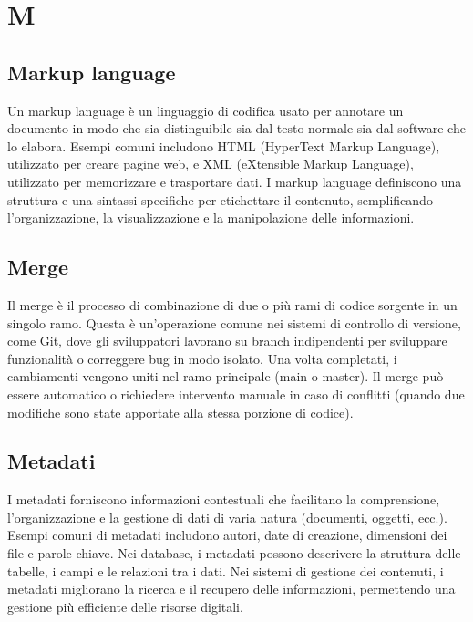 \section{M}
\vspace{2em}
\subsection*{Markup language}
\par Un markup language è un linguaggio di codifica usato per annotare un documento in modo che sia distinguibile sia dal testo normale sia dal software che lo elabora. Esempi comuni includono HTML (HyperText Markup Language), utilizzato per creare pagine web, e XML (eXtensible Markup Language), utilizzato per memorizzare e trasportare dati. I markup language definiscono una struttura e una sintassi specifiche per etichettare il contenuto, semplificando l'organizzazione, la visualizzazione e la manipolazione delle informazioni.

\vspace{2em}
\subsection*{Merge}
\par Il merge è il processo di combinazione di due o più rami di codice sorgente in un singolo ramo. Questa è un'operazione comune nei sistemi di controllo di versione, come Git, dove gli sviluppatori lavorano su branch indipendenti per sviluppare funzionalità o correggere bug in modo isolato. Una volta completati, i cambiamenti vengono uniti nel ramo principale (main o master). Il merge può essere automatico o richiedere intervento manuale in caso di conflitti (quando due modifiche sono state apportate alla stessa porzione di codice).

\vspace{2em}
\subsection*{Metadati}
\par I metadati forniscono informazioni contestuali che facilitano la comprensione, l'organizzazione e la gestione di dati di varia natura (documenti, oggetti, ecc.). Esempi comuni di metadati includono autori, date di creazione, dimensioni dei file e parole chiave. Nei database, i metadati possono descrivere la struttura delle tabelle, i campi e le relazioni tra i dati. Nei sistemi di gestione dei contenuti, i metadati migliorano la ricerca e il recupero delle informazioni, permettendo una gestione più efficiente delle risorse digitali.

